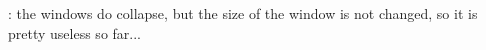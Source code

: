 
\begin{DoxyRefList}
\item[Member \mbox{\hyperlink{class_obj_cryst_1_1_w_x_cryst_obj_ae55c3091101cae5d79e5aacb77c48856}{Obj\+Cryst::W\+X\+Cryst\+Obj::On\+Toggle\+Collapse}} (wx\+Command\+Event \&W\+X\+U\+N\+U\+S\+E\+D(event))]\label{bug__bug000001}%
%
\+: the windows do collapse, but the size of the window is not changed, so it is pretty useless so far... 
\end{DoxyRefList}